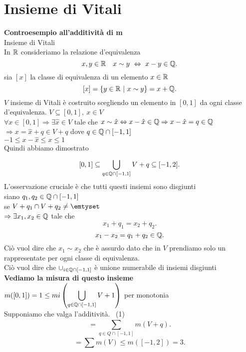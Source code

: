 \documentclass{article}
\begin{document}

\maketitle
	\newpage
	\section{Insieme di Vitali}
	\textbf{Controesempio all'additività di m}\\
	Insieme di Vitali\\
	In $\mathbb{R}$ consideriamo la relazione d'equivalenza
	\[
	x,y\in\R \ \ \ x\sim y \ \Leftrightarrow \ x-y\in\Q
	.\] 
	sia $[x]$ la classe di equivalenza di un elemento $x\in \mathbb{R}$\\
	 \[
		 [x] = \{y\in \mathbb{R} \ | \ x\sim y\} = x + \mathbb{Q}
	.\] 
	$V$ insieme di Vitali è costruito scegliendo un elemento in $[0,1]$ da ogni classe d'equivalenza.  $V\subseteq[0,1], \ x\in V$ \\
	$\forall x\in[0,1] \Rightarrow \exists \hat x\in V$ tale che $x\sim \hat x \Leftrightarrow x-\hat x \in \mathbb{Q} \Rightarrow x - \hat x = q\in\mathbb{Q}$ \\
	$ \Rightarrow x=\hat x + q\in V + q$ dove $q\in\mathbb{Q}\cap [-1,1]$\\
	 $-1\leq x - \hat x \leq x\leq 1$ \\
	 Quindi abbiamo dimostrato
	 \[
		 [0,1]\subseteq \bigcup^{}_{q\in\mathbb{Q}\cap[-1,1]} V + q\subseteq[-1,2]
	 .\] 
	 L'osservazione cruciale è che tutti questi insiemi sono disgiunti\\
	 siano $q_1,q_2\in \mathbb{Q}\cap [-1,1]$\\
	 se $V+ q_1\cap V + q_2\neq \emtyset$\\
	 $ \Rightarrow \exists x_1,x_2\in\mathbb{Q} $ tale che 
	 \[
	 x_1 + q_1 =x_2 + q_2
	 .\] 
	 \[
	 x_1 -x_2 = q_1 + q_2\in\mathbb{Q}
	 .\] 
	 Ciò vuol dire che $x_1\sim x_2$ che è assurdo dato che in $V$ prendiamo solo un rappresentate per ogni classe di equivalenza.\\
	 Ciò vuol dire che $\cup_{i\in\mathbb{Q}\cap[-1,1]}$ è unione numerabile di insiemi disgiunti\\
	  \textbf{Vediamo la misura di questo insieme}\\
	  $\displaystyle m([0,1]) = 1 \leq mi \left(\bigcup_{q\in\mathbb{Q}\cap[-1,1]}V + 1 \right)$ per monotonia\\
	  Supponiamo che valga l'additività. \ \hfill (1)
	  \[
		  = \sum^{}_{q\in Q\cap[-1, 1]}m (V + q)
	  .\] 
	  \[
		  = \sum^{}_{} m(V) \leq m([-1,2]) = 3
	  .\] 
\end{document}
